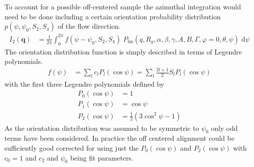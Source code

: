 To account for a possible off-centered sample the azimuthal integration would need to be done including a certain orientation probability distribution $p(\psi,\psi_0,S_2,S_4)$ of the flow direction.
\begin{align}\label{eq:case1offcentered}
  I_2(\mathbf{q}) & = \frac{1}{2\pi}\int_{0}^{2\pi}  f(\psi-\psi_0,S_2,S_4) \; P_\mathrm{lin}(q,R_g,\alpha,\beta,\gamma,A,B,\mathit{\Gamma},\varphi=0,\theta,\psi) \;\mathrm{d}\psi
\end{align}
The orientation distribution function is simply described in terms of Legendre polynomials.
\begin{align}
f(\psi) &= \sum_l c_l P_l(\cos\psi) = \sum_l \frac{2l+1}{2} S_l P_l(\cos\psi)
\end{align}
with the first three Legendre polynomials defined by
\begin{subequations}
\begin{align}
P_0(\cos\psi) &= 1\\
P_1(\cos\psi) &= \cos\psi\ \\
P_2(\cos\psi) &= \frac{1}{2}\left(3\cos^2\psi-1\right)
\end{align}
\end{subequations}
As the orientation distribution was assumed to be symmetric to $\psi_0$ only odd terms have been considered. In practice the off centered alignment could be sufficiently good corrected for using just the $P_0(\cos\psi)$ and $P_2(\cos\psi)$ with $c_0=1$ and $c_2$ and $\psi_0$ being fit parameters.

